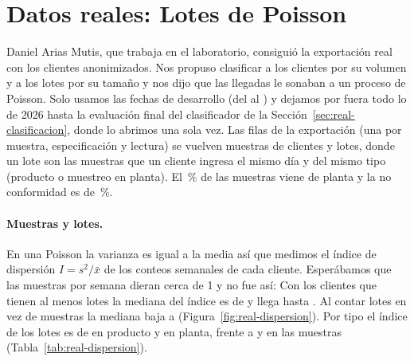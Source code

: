 \section{Datos reales: Lotes de Poisson}
\label{sec:datos-reales}

\ifdefined\RealMuestras
Daniel Arias Mutis, que trabaja en el laboratorio, consiguió la exportación
real con los clientes anonimizados. Nos propuso
clasificar a los clientes por su volumen y a los lotes por su tamaño y nos
dijo que las llegadas le sonaban a un proceso de Poisson. Solo usamos las
fechas de desarrollo (del \RealDesde{} al \RealHasta{}) y dejamos por fuera
todo lo de 2026 hasta la evaluación final del clasificador de la
Sección~\ref{sec:real-clasificacion}, donde lo abrimos una sola vez. Las
\RealFilas{} filas de la exportación (una por muestra, especificación y
lectura) se vuelven \RealMuestras{} muestras de \RealClientes{} clientes y
\RealLotes{} lotes, donde un lote son las muestras que un cliente ingresa el
mismo día y del mismo tipo (producto o muestreo en planta). El
\RealPlantaPct{}\,\% de las muestras viene de planta y la no conformidad es
de \RealNoConformePct{}\,\%.

\paragraph{Muestras y lotes.} En una Poisson la varianza es igual a la media
así que medimos el índice de dispersión $I = s^2/\bar x$ de los conteos
semanales de cada cliente. Esperábamos que las muestras por semana dieran
cerca de 1 y no fue así: Con los \RealClientesDispersion{} clientes que
tienen al menos \RealMinimoLotes{} lotes la mediana del índice es de
\RealDispMuestrasTodos{} y llega hasta \RealDispMuestrasMax{}. Al contar
lotes en vez de muestras la mediana baja a \RealDispLotesTodos{}
(Figura~\ref{fig:real-dispersion}). Por tipo el índice de los lotes es de
\RealDispLotesProducto{} en producto y \RealDispLotesPlanta{} en planta,
frente a \RealDispMuestrasProducto{} y \RealDispMuestrasPlanta{} en las
muestras (Tabla~\ref{tab:real-dispersion}).

